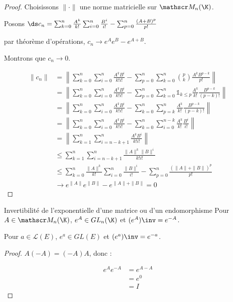 \begin{proof}
    Choisissons $\| \cdot \|$ une norme matricielle sur $\mathscr M_n(\K)$. 

    Posons $\ds c_n = \sum_{k = 0}^{n} \frac{A^k}{k!} \sum_{i = 0}^{n } \frac{B^i}{i!} - \sum_{p = 0}^{n} \frac{(A + B)^p}{p!}$

    par théorème d'opérations, $c_n \to e^A e^B - e^{A + B}$.

    Montrons que $c_n \to 0$.  

    \begin{align}
        \| c_n \| & = \left\| \sum_{k = 0}^{n} \sum_{i = 0}^{n} \frac{A^k B^i}{k! i!} - \sum_{p = 0}^{n} \sum_{k = 0}^{n } \binom p k \frac{A^k B^{p - k}}{p!} \right\| \\
        & = \left\| \sum_{k = 0}^n \sum_{i = 0}^{n} \frac{A^k B^i}{k! i!} - \sum_{p = 0}^{n} \sum_{k = 0}^{n} \mathbb 1_{k \leqslant p} \frac{A^k}{k!} \frac{B^{p - k}}{(p - k)!} \right\| \\
        & = \left\| \sum_{k = 0}^{n} \sum_{i = 0}^{n} \frac{A^k B^i}{k! i!} - \sum_{k = 0}^{n} \sum_{p = k}^n \frac{A^k}{k!} \frac{B^{p - k}}{(p - k)!} \right\| \\
        & = \left\| \sum_{k = 0}^{n} \sum_{i = 0}^{n} \frac{A^k B^i}{k! i!} - \sum_{k = 0}^{n} \sum_{i = 0}^{n - k} \frac{A^k}{k!} \frac{B^{i}}{i!} \right\| \\
        & = \left\| \sum_{k = 1}^n \sum_{i = n - k + 1}^{n} \frac{A^k B^i}{k! i!} \right\| \\
        & \leqslant \sum_{k = 1}^{n } \sum_{i = n - k + 1}^{n} \frac{\| A \|^k \| B \|^i}{k! i!} \\
        & \leqslant \sum_{k = 0}^{n} \frac{\| A \|^k}{k!} \sum_{i = 0}^n \frac{\| B \|^i}{i!} - \sum_{p = 0}^{n} \frac{(\| A \| + \| B \|)^p}{p!} \\
        & \to e^{\| A \|} e^{\| B \|} - e^{\| A \| + \| B \|} = 0
    \end{align}
\end{proof}

\begin{corollairent}{Invertibilité de l'exponentielle d'une matrice ou d'un endomorphisme}{}
    Pour $A \in \mathscr M_n(\K)$, $e^A \in GL_n(\K)$ et $(e^A)\inv = e^{-A}$.

    Pour $a \in \mathscr L(E)$, $e^a \in GL(E)$ et $(e^a)\inv = e^{-a}$.
\end{corollairent}

\begin{proof}
    $A(-A) = (-A)A$, donc : 

    \begin{align}
        e^A e^{-A} & = e^{A - A} \\
        & = e^0 \\
        & = I
    \end{align}
\end{proof}

